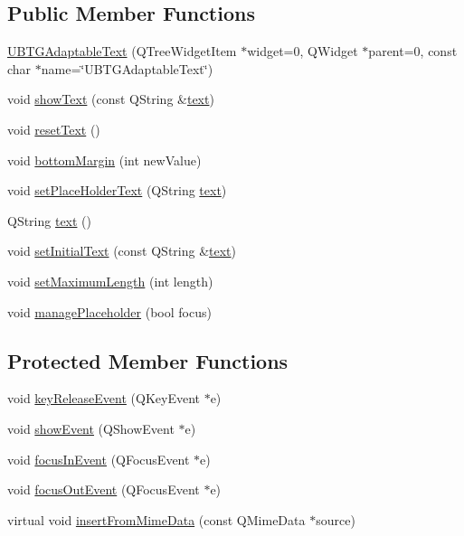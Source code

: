 \subsection*{Public Member Functions}
\begin{DoxyCompactItemize}
\item 
\hyperlink{class_u_b_t_g_adaptable_text_a48618a00fb15801d1e40e1ec98a2c540}{U\-B\-T\-G\-Adaptable\-Text} (Q\-Tree\-Widget\-Item $\ast$widget=0, Q\-Widget $\ast$parent=0, const char $\ast$name=\char`\"{}U\-B\-T\-G\-Adaptable\-Text\char`\"{})
\item 
void \hyperlink{class_u_b_t_g_adaptable_text_ad2039c06e55398d459a78b6493c37496}{show\-Text} (const Q\-String \&\hyperlink{class_u_b_t_g_adaptable_text_abc01215ceb6a24147b846b344b7557ce}{text})
\item 
void \hyperlink{class_u_b_t_g_adaptable_text_a8abbbc15740307ea5613445fdcc682a3}{reset\-Text} ()
\item 
void \hyperlink{class_u_b_t_g_adaptable_text_a012f2599f535628ea39f482f3fef6db0}{bottom\-Margin} (int new\-Value)
\item 
void \hyperlink{class_u_b_t_g_adaptable_text_a25c1b482d596c31210197ef4d48a48e4}{set\-Place\-Holder\-Text} (Q\-String \hyperlink{class_u_b_t_g_adaptable_text_abc01215ceb6a24147b846b344b7557ce}{text})
\item 
Q\-String \hyperlink{class_u_b_t_g_adaptable_text_abc01215ceb6a24147b846b344b7557ce}{text} ()
\item 
void \hyperlink{class_u_b_t_g_adaptable_text_a11880e0e1a770203ba9a4e189e07226d}{set\-Initial\-Text} (const Q\-String \&\hyperlink{class_u_b_t_g_adaptable_text_abc01215ceb6a24147b846b344b7557ce}{text})
\item 
void \hyperlink{class_u_b_t_g_adaptable_text_afded2840e343a607a0f40b9f57ca35f3}{set\-Maximum\-Length} (int length)
\item 
void \hyperlink{class_u_b_t_g_adaptable_text_a196a86ef5f0b83aa9b5376b1551a7a4e}{manage\-Placeholder} (bool focus)
\end{DoxyCompactItemize}
\subsection*{Protected Member Functions}
\begin{DoxyCompactItemize}
\item 
void \hyperlink{class_u_b_t_g_adaptable_text_a2a65d95bc5641c89db53fac4bc0cfafb}{key\-Release\-Event} (Q\-Key\-Event $\ast$e)
\item 
void \hyperlink{class_u_b_t_g_adaptable_text_ab0d40973bab7181de299a7d47db694f2}{show\-Event} (Q\-Show\-Event $\ast$e)
\item 
void \hyperlink{class_u_b_t_g_adaptable_text_a6a5dc605f9b9d92f339a364aaa7bd4f4}{focus\-In\-Event} (Q\-Focus\-Event $\ast$e)
\item 
void \hyperlink{class_u_b_t_g_adaptable_text_a1cd4b4a49e4ae95cc7bd6af01320f5ce}{focus\-Out\-Event} (Q\-Focus\-Event $\ast$e)
\item 
virtual void \hyperlink{class_u_b_t_g_adaptable_text_a95042078918d78ece284b16a179ade05}{insert\-From\-Mime\-Data} (const Q\-Mime\-Data $\ast$source)
\end{DoxyCompactItemize}


